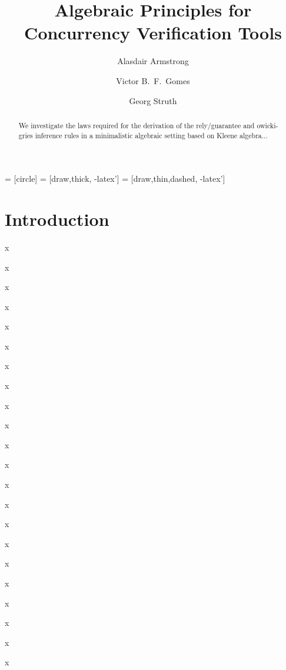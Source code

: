 \documentclass{llncs}
\begin{document}
 = [circle]
 = [draw,thick, -latex']
 = [draw,thin,dashed, -latex']

\title{Algebraic Principles for Concurrency Verification Tools}

\author{Alasdair Armstrong \and Victor B.~F.~Gomes \and Georg Struth}


\maketitle

\begin{abstract}
We investigate the laws required for the derivation of the
rely/guarantee and owicki-gries inference rules in a minimalistic
algebraic setting based on Kleene algebra...
\end{abstract}

\pagestyle{plain}

\section{Introduction}

\cite{hoare_concurrent_2011}
\cite{kozen_completeness_1994}
\cite{kozen_kleene_1997}
\cite{armstrong_kleene_2013}
\cite{nipkow_isabelle/hol:_2002}

x

x

x

x

x

x

x

x

x

x

x

x

x

x

x

x

x

x

x

x

x

x
\end{document}
